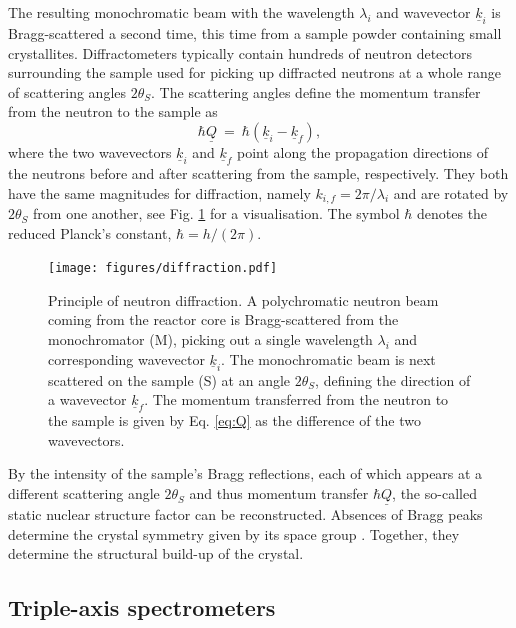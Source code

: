 The resulting monochromatic beam with the wavelength $\lambda_i$ and wavevector $\underline{k}_i$ is Bragg-scattered
a second time, this time from a sample powder containing small crystallites. Diffractometers typically contain hundreds
of neutron detectors surrounding the sample used for picking up diffracted neutrons at a whole range of scattering angles
$2 \theta_S$. The scattering angles define the momentum transfer from the neutron to the sample as \cite[p. 11]{Shirane2002}
\begin{equation}
	\label{eq:Q}
	\hbar \underline{Q} \ =\  \hbar \left( \underline{k}_i - \underline{k}_f \right),
\end{equation}
where the two wavevectors $\underline{k}_i$ and $\underline{k}_f$ point along the propagation directions of the neutrons
before and after scattering from the sample, respectively. They both have the same magnitudes for diffraction, namely
$k_{i,f} = 2\pi / \lambda_i$ and are rotated by $2\theta_S$ from one another, see Fig. \ref{fig:diffraction} for a visualisation.
The symbol $\hbar$ denotes the reduced Planck's constant, $\hbar = h / \left( 2\pi \right)$.

\begin{figure}[htb]
	\centering
	\texttt{[image: figures/diffraction.pdf]}
	\caption[Neutron diffraction.]{
		Principle of neutron diffraction. A polychromatic neutron beam coming from the reactor core is Bragg-scattered
		from the monochromator (M), picking out a single wavelength $\lambda_i$ and corresponding wavevector $\underline{k}_i$.
		The monochromatic beam is next scattered on the sample (S) at an angle $2\theta_S$, defining the direction of a
		wavevector $\underline{k}_f$. The momentum transferred from the neutron to the sample is given by Eq. \ref{eq:Q}
		as the difference of the two wavevectors.}
	\label{fig:diffraction}
\end{figure}

By the intensity of the sample's Bragg reflections, each of which appears at a different scattering angle $2\theta_S$
and thus momentum transfer $\hbar \underline{Q}$, the so-called static nuclear structure factor \cite[p. 25]{Shirane2002}
can be reconstructed.
Absences of Bragg peaks determine the crystal symmetry given by its space group \cite[pp. 13-15]{Gross2012}.
Together, they determine the structural build-up of the crystal.


\subsection{Triple-axis spectrometers}

